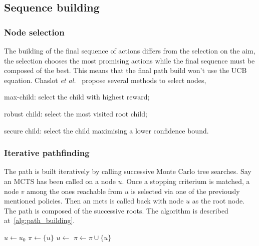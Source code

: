 \documentclass[twoside,twocolumn]{article}
\DeclareMathOperator{\argmax}{argmax}
\begin{document}
\subsection{Sequence building}
\subsubsection{Node selection}\label{sssec:node_selection}
The building of the final sequence of actions differs from the selection on the
aim, the selection chooses the most promising actions while the final sequence
must be composed of the best. This means that the final path build won't use the
UCB equation. Chaslot \textit{et al.}~\cite{browne2012survey} propose several
methods to select nodes,
\begin{compactitem}
  \item max-child: select the child with highest reward;
  \item robust child: select the most visited root child;
  \item secure child: select the child maximising a lower confidence bound.
\end{compactitem}

\subsubsection{Iterative pathfinding}
The path is built iteratively by calling successive Monte Carlo tree searches.
Say an MCTS has been called on a node \(u\). Once a stopping criterium is
matched, a node \(v\) among the ones reachable from \(u\) is selected via one of
the previously mentioned policies. Then an mcts is called back with node \(u\)
as the root node. The path is composed of the successive roots. The algorithm is
described at~\ref{alg:path_building}.
\begin{algorithm}
  \caption{%
    Path building. The {\sc NextNode} (here max-child) function is one among
    those in~\ref{sssec:node_selection}.
  }\label{alg:path_building}
  \begin{algorithmic}
    \State{}\(u \gets u_0\)
    \State{}\(\pi \gets \{u\}\)
      \State{}
      \State{}\(u \gets\)
      \State{}\(\pi \gets \pi \cup \{u\}\)
    \EndFor{}
    \State{}\Return{$\pi$}
    \EndFunction{}
    \State{}\Return{$\argmax\{Q(v) | v \text{\,children of\,} u\}$}
    \EndFunction{}
  \end{algorithmic}
\end{algorithm}
\end{document}
